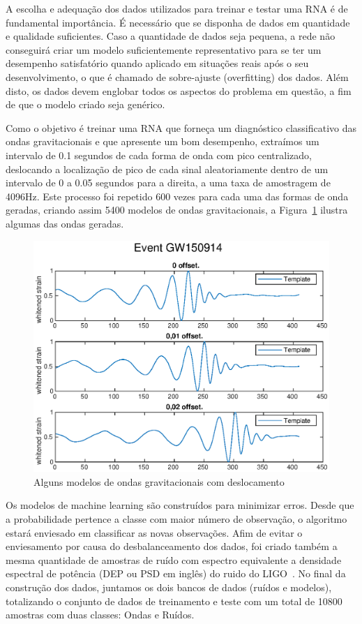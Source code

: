 A escolha e adequação dos dados utilizados para treinar e testar uma RNA é de fundamental importância. É necessário que se disponha de dados em quantidade e qualidade suficientes. Caso a quantidade de dados seja pequena, a rede não conseguirá criar um modelo suficientemente representativo para se ter um desempenho satisfatório quando aplicado em situações reais após o seu desenvolvimento, o que é chamado de sobre-ajuste (overfitting) dos dados. Além disto, os dados devem englobar todos os aspectos do problema em questão, a fim de que o modelo criado seja genérico. 

Como o objetivo é treinar uma RNA que forneça um diagnóstico classificativo das ondas gravitacionais e que apresente um bom desempenho, extraímos um intervalo de 0.1 segundos de cada forma de onda com pico centralizado, deslocando a localização de pico de cada sinal aleatoriamente dentro de um intervalo de 0 a 0.05 segundos para a direita, a uma taxa de amostragem de 4096Hz. Este processo foi repetido 600 vezes para cada uma das formas de onda geradas, criando assim 5400 modelos de ondas gravitacionais, a Figura~\ref{fig:gw150914-offset} ilustra algumas das ondas geradas.

\begin{figure}[ht]
    \centerline{\includegraphics[width=1\textwidth]{figuras/GW150914.eps}}
    \caption{Alguns modelos de ondas gravitacionais com deslocamento}
    \label{fig:gw150914-offset}
\end{figure}

Os modelos de machine learning são construídos para minimizar erros. Desde que a probabilidade pertence a classe com maior número de observação, o algoritmo estará enviesado em classificar as novas observações. Afim de evitar o enviesamento por causa do desbalanceamento dos dados, foi criado também a mesma quantidade de amostras de ruído com espectro equivalente a densidade espectral de potência (DEP ou PSD em inglês) do ruido do LIGO~\cite{T1800044}. No final da construção dos dados, juntamos os dois bancos de dados (ruídos e modelos), totalizando o conjunto de dados de treinamento e teste com um total de 10800 amostras com duas classes: Ondas e Ruídos.

